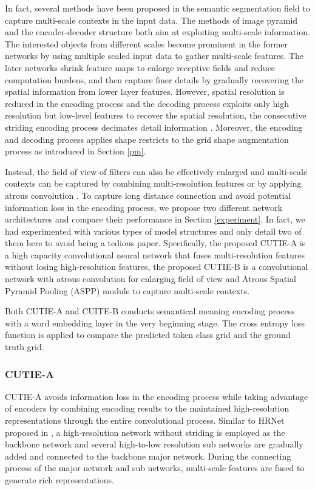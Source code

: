 \documentclass[10pt,twocolumn,letterpaper]{article}
\begin{document}
In fact, several methods have been proposed in the semantic segmentation field to capture multi-scale contexts in the input data. The methods of image pyramid and the encoder-decoder structure both aim at exploiting multi-scale information. The interested objects from different scales become prominent in the former networks by using multiple scaled input data to gather multi-scale features. The later networks shrink feature maps to enlarge receptive fields and reduce computation burdens, and then capture finer details by gradually recovering the spatial information from lower layer features. However, spatial resolution is reduced in the encoding process and the decoding process exploits only high resolution but low-level features to recover the spatial resolution, the consecutive striding encoding process decimates detail information \cite{hrnet}. Moreover, the encoding and decoding process applies shape restricts to the grid shape augmentation process as introduced in Section \ref{pm}. 

Instead, the field of view of filters can also be effectively enlarged and multi-scale contexts can be captured by combining multi-resolution features \cite{hrnet} or by applying atrous convolution \cite{deeplab, deeplabv1, deeplabv3, deeplabv3p}. To capture long distance connection and avoid potential information loss in the encoding process, we propose two different network architectures and compare their performance in Section \ref{experiment}. In fact, we had experimented with various types of model structures and only detail two of them here to avoid being a tedious paper. Specifically, the proposed CUTIE-A is a high capacity convolutional neural network that fuses multi-resolution features without losing high-resolution features, the proposed CUTIE-B is a convolutional network with atrous convolution for enlarging field of view and Atrous Spatial Pyramid Pooling (ASPP) module to capture multi-scale contexts. 

Both CUTIE-A and CUITE-B conducts semantical meaning encoding process with a word embedding layer in the very beginning stage. The cross entropy loss function is applied to compare the predicted token class grid and the ground truth grid.

\subsubsection{CUTIE-A}
CUTIE-A avoids information loss in the encoding process while taking advantage of encoders by combining encoding results to the maintained high-resolution representations through the entire convolutional process. Similar to HRNet proposed in \cite{hrnet}, a high-resolution network without striding is employed as the backbone network and several high-to-low resolution sub networks are gradually added and connected to the backbone major network. During the connecting process of the major network and sub networks, multi-scale features are fused to generate rich representations.
\end{document}
